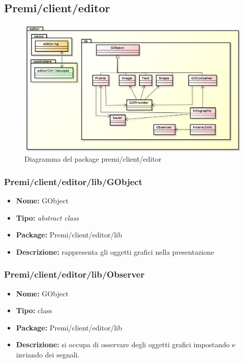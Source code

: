 \subsection{Premi/client/editor}
\begin{figure}[!h]
\begin{center}
\includegraphics[scale=0.45]{img/diapkg/editor.png}
\caption{Diagramma del package premi/client/editor}
\end{center}
\end{figure}
\subsubsection{Premi/client/editor/lib/GObject}
\begin{itemize}
  \item[] \textbf{Nome:} GObject
  \item[] \textbf{Tipo:} \textit{abstract class}
  \item[] \textbf{Package:} Premi/client/editor/lib
  \item[] \textbf{Descrizione:} rappresenta gli oggetti grafici nella presentazione
\end{itemize}
\subsubsection{Premi/client/editor/lib/Observer}
\begin{itemize}
  \item[] \textbf{Nome:} GObject
  \item[] \textbf{Tipo:} class
  \item[] \textbf{Package:} Premi/client/editor/lib
  \item[] \textbf{Descrizione:} si occupa di osservare degli oggetti grafici impostando e inviando dei segnali.
\end{itemize}

